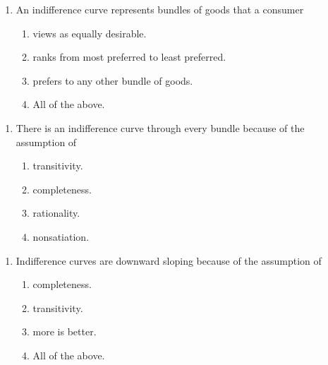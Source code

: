 \documentclass[11pt,]{article}
\providecommand{\tightlist}{%
  \setlength{\itemsep}{0pt}\setlength{\parskip}{0pt}}
\begin{document}
\begin{enumerate}
\def\labelenumi{\arabic{enumi})}
\setcounter{enumi}{5}
\tightlist
\item
  An indifference curve represents bundles of goods that a consumer

  \begin{enumerate}
  \def\labelenumii{\Alph{enumii})}
  \tightlist
  \item
    views as equally desirable.
  \item
    ranks from most preferred to least preferred.
  \item
    prefers to any other bundle of goods.
  \item
    All of the above.
  \end{enumerate}
\end{enumerate}

\newpage

\begin{enumerate}
\def\labelenumi{\arabic{enumi})}
\setcounter{enumi}{6}
\tightlist
\item
  There is an indifference curve through every bundle because of the
  assumption of

  \begin{enumerate}
  \def\labelenumii{\Alph{enumii})}
  \tightlist
  \item
    transitivity.
  \item
    completeness.
  \item
    rationality.
  \item
    nonsatiation.
  \end{enumerate}
\end{enumerate}

\begin{enumerate}
\def\labelenumi{\arabic{enumi})}
\setcounter{enumi}{7}
\tightlist
\item
  Indifference curves are downward sloping because of the assumption of

  \begin{enumerate}
  \def\labelenumii{\Alph{enumii})}
  \tightlist
  \item
    completeness.
  \item
    transitivity.
  \item
    more is better.
  \item
    All of the above.
  \end{enumerate}
\end{enumerate}
\end{document}

